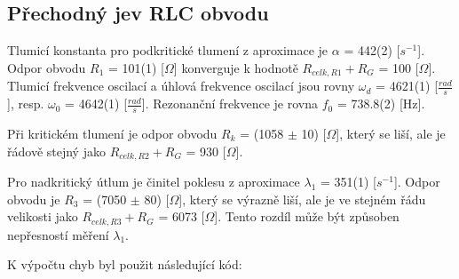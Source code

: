 \documentclass[a4paper,11pt]{article}
\begin{document}
\hspace{10pt}
\begin{minipage}[t]{0.5\textwidth} 
            \subsection{Přechodný jev RLC obvodu}
                Tlumicí konstanta pro podkritické tlumení z aproximace je $\alpha$ = 442(2) [$s^{-1}$]. Odpor obvodu $R_1$ = 101(1) [$\Omega$] konverguje k hodnotě $R_{celk, R1} + R_G$ = 100 [$\Omega$]. Tlumicí frekvence oscilací a úhlová frekvence oscilací jsou rovny $\omega_d$ = 4621(1) [$\frac{rad}{s}$], resp. $\omega_0$ = 4642(1) [$\frac{rad}{s}$]. Rezonanční frekvence je rovna $f_0$ = 738.8(2) [Hz].
                \par Při kritickém tlumení je odpor obvodu $R_k$ = (1058 $\pm$ 10) [$\Omega$], který se liší, ale je řádově stejný jako $R_{celk, R2} + R_G$ = 930 [$\Omega$].
                \par Pro nadkritický útlum je činitel poklesu z aproximace $\lambda_1$ = 351(1) [$s^{-1}$]. Odpor obvodu je $R_3$ = (7050 $\pm$ 80) [$\Omega$], který se výrazně liší, ale je ve stejném řádu velikosti jako $R_{celk, R3} + R_G$ = 6073 [$\Omega$]. Tento rozdíl může být způsoben nepřesností měření $\lambda_1$.
\end{minipage}
\newpage 
    \par K výpočtu chyb byl použit následující kód: 
\end{document}
